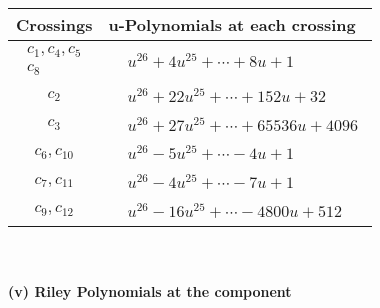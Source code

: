 \documentclass[1p]{elsarticle_modified}
\theoremstyle{definition}
\begin{document}
\begin{tabular}{m{50pt}|m{274pt}}
Crossings & \hspace{64pt}u-Polynomials at each crossing \\
\hline $$\begin{aligned}c_{1},c_{4},c_{5}\\c_{8}\end{aligned}$$&$\begin{aligned}
&u^{26}+4 u^{25}+\cdots+8 u+1
\end{aligned}$\\
\hline $$\begin{aligned}c_{2}\end{aligned}$$&$\begin{aligned}
&u^{26}+22 u^{25}+\cdots+152 u+32
\end{aligned}$\\
\hline $$\begin{aligned}c_{3}\end{aligned}$$&$\begin{aligned}
&u^{26}+27 u^{25}+\cdots+65536 u+4096
\end{aligned}$\\
\hline $$\begin{aligned}c_{6},c_{10}\end{aligned}$$&$\begin{aligned}
&u^{26}-5 u^{25}+\cdots-4 u+1
\end{aligned}$\\
\hline $$\begin{aligned}c_{7},c_{11}\end{aligned}$$&$\begin{aligned}
&u^{26}-4 u^{25}+\cdots-7 u+1
\end{aligned}$\\
\hline $$\begin{aligned}c_{9},c_{12}\end{aligned}$$&$\begin{aligned}
&u^{26}-16 u^{25}+\cdots-4800 u+512
\end{aligned}$\\
\hline
\end{tabular}\\~\\
\newpage\renewcommand{\arraystretch}{1}
\flushleft \textbf{(v) Riley Polynomials at the component}\newline \\
\end{document}
